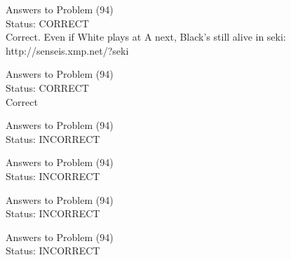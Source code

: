 \documentclass[11pt]{article}
\begin{document}
\begin{minipage}[t]{0.5\textwidth}
  {\centering
  
  Answers to Problem (94)\\
  Status: CORRECT\\
  Correct. Even if White plays at A next, Black's still alive in seki: http://senseis.xmp.net/?seki\\
  }
\end{minipage}
\begin{minipage}[t]{0.5\textwidth}
  {\centering
  
  Answers to Problem (94)\\
  Status: CORRECT\\
  Correct\\
  }
\end{minipage}
\begin{minipage}[t]{0.5\textwidth}
  {\centering
  
  Answers to Problem (94)\\
  Status: INCORRECT\\
  
  }
\end{minipage}
\begin{minipage}[t]{0.5\textwidth}
  {\centering
  
  Answers to Problem (94)\\
  Status: INCORRECT\\
  
  }
\end{minipage}
\begin{minipage}[t]{0.5\textwidth}
  {\centering
  
  Answers to Problem (94)\\
  Status: INCORRECT\\
  
  }
\end{minipage}
\begin{minipage}[t]{0.5\textwidth}
  {\centering
  
  Answers to Problem (94)\\
  Status: INCORRECT\\
  
  }
\end{minipage}
\end{document}
